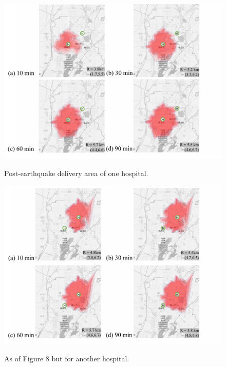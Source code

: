 \documentclass[review,11pt,nonatbib]{elsarticle}
\begin{document}
\begin{figure}[!htp]\centering
\includegraphics[width=12cm]{contour_hospital_1.pdf}\\
\caption{Post-earthquake delivery area of one hospital.}\label{fig8}
\end{figure}

\begin{figure}[!htp]\centering
\includegraphics[width=12cm]{contour_hospital_2.pdf}\\
\caption{As of Figure 8 but for another hospital.}\label{fig9}
\end{figure}
\end{document}
